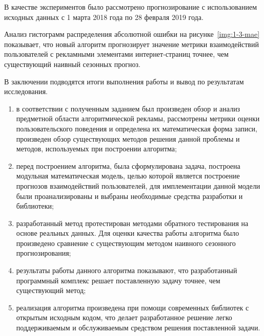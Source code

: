 \documentclass[a4paper, 14pt, oneside]{extarticle}
\begin{document}
    В качестве экспериментов было рассмотрено прогнозирование с использованием исходных 
    данных с 1 марта 2018 года по 28 февраля 2019 года.

    Анализ гистограмм распределения абсолютной ошибки на рисунке~\ref{img:1-3-mae} показывает, что новый алгоритм прогнозирует значение метрики взаимодействий пользователей с
    рекламными элементами интернет-страниц точнее, чем существующий наивный сезонных прогноз.
    \newpage
    
    \medskip
    

    В заключении подводятся итоги выполнения работы и вывод по результатам исследования.
    \newpage
    \begin{enumerate}
        \item в соответствии с полученным заданием был произведен обзор и анализ предметной области
алгоритмической рекламы, рассмотрены метрики оценки пользовательского поведения и определена
их математическая форма записи, произведен обзор существующих методов решения данной проблемы и
методов, используемых при построении алгоритма;

    \item перед построением алгоритма, была сформулирована задача, построена модульная математическая модель, 
    целью которой является построение прогнозов взаимодействий пользователей, для имплементации 
    данной модели были проанализированы и выбраны необходимые средства разработки и библиотеки;

    \item разработанный метод протестирован методами обратного тестирования на основе реальных данных.
    Для оценки качества работы алгоритма было произведено сравнение с существующим методом наивного
    сезонного прогнозирования;

    \item результаты работы данного алгоритма показывают, что разработанный программный комплекс решает
    поставленную задачу точнее, чем существующий метод;

    \item реализация алгоритма произведена при помощи современных библиотек с открытым
    исходным кодом, что делает разработанное решение легко поддерживаемым и обслуживаемым 
    средством решения поставленной задачи.
    \end{enumerate}
\end{document}

